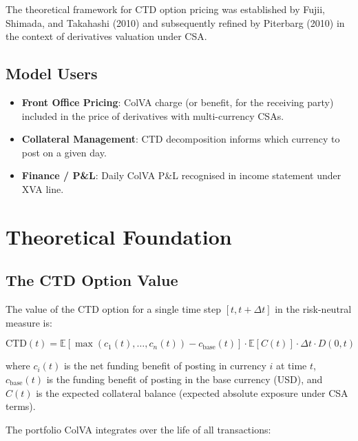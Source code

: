\documentclass[11pt,a4paper]{article}
\begin{document}
The theoretical framework for CTD option pricing was established by Fujii, Shimada, and
Takahashi (2010) and subsequently refined by Piterbarg (2010) in the context of derivatives
valuation under CSA.

\subsection{Model Users}

\begin{itemize}[leftmargin=*]
  \item \textbf{Front Office Pricing}: ColVA charge (or benefit, for the receiving party) included in the price of derivatives with multi-currency CSAs.
  \item \textbf{Collateral Management}: CTD decomposition informs which currency to post on a given day.
  \item \textbf{Finance / P\&L}: Daily ColVA P\&L recognised in income statement under XVA line.
\end{itemize}

\section{Theoretical Foundation}

\subsection{The CTD Option Value}

The value of the CTD option for a single time step $[t, t+\Delta t]$ in the risk-neutral
measure is:

\begin{equation}
\mathrm{CTD}(t) = \mathbb{E}\!\left[\max\!\left(c_1(t),\ldots,c_n(t)\right) - c_{\mathrm{base}}(t)\right]
  \cdot \mathbb{E}\!\left[C(t)\right] \cdot \Delta t \cdot D(0,t)
\tag{2}
\end{equation}

where $c_i(t)$ is the net funding benefit of posting in currency $i$ at time $t$,
$c_{\mathrm{base}}(t)$ is the funding benefit of posting in the base currency (USD), and
$C(t)$ is the expected collateral balance (expected absolute exposure under CSA terms).

The portfolio ColVA integrates over the life of all transactions:
\end{document}
